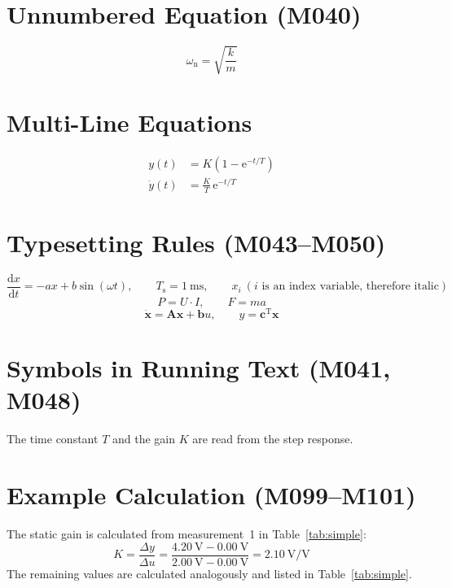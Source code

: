 \documentclass[state=Report]{mcidoc}
\begin{document}
\section{Unnumbered Equation (M040)}
\begin{equation*}
  \omega_\mathrm{n} = \sqrt{\frac{k}{m}}
\end{equation*}

\section{Multi-Line Equations}
\begin{align*}
  y(t) &= K \left( 1 - \mathrm{e}^{-t/T} \right) \\
  \dot{y}(t) &= \frac{K}{T} \, \mathrm{e}^{-t/T}
\end{align*}

\section{Typesetting Rules (M043–M050)}
\begin{equation*}
  \frac{\mathrm{d}x}{\mathrm{d}t} = -a x + b \sin(\omega t), \qquad
  T_\mathrm{s} = \qty{1}{\milli\second}, \qquad
  x_i \ (i \text{ is an index variable, therefore italic})
\end{equation*}
\begin{equation*}
  P = U \cdot I, \qquad F = m a
\end{equation*}
\begin{equation*}
  \dot{\mathbf{x}} = \mathbf{A}\mathbf{x} + \mathbf{b}u, \qquad
  y = \mathbf{c}^\mathrm{T}\mathbf{x}
\end{equation*}

\section{Symbols in Running Text (M041, M048)}
The time constant $T$ and the gain $K$ are read from the step response.

\section{Example Calculation (M099–M101)}
The static gain is calculated from measurement~1 in Table~\ref{tab:simple}:
\begin{equation*}
  K = \frac{\Delta y}{\Delta u}
    = \frac{\qty{4.20}{\volt} - \qty{0.00}{\volt}}{\qty{2.00}{\volt} - \qty{0.00}{\volt}}
    = \qty{2.10}{\volt\per\volt}
\end{equation*}
The remaining values are calculated analogously and listed in
Table~\ref{tab:simple}.
\end{document}
